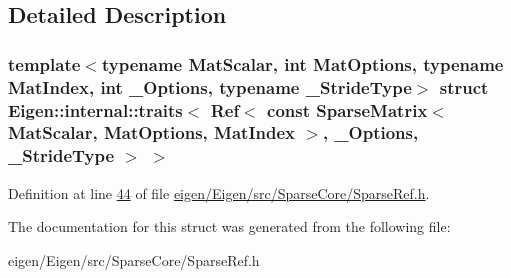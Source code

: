 \subsection{Detailed Description}
\subsubsection*{template$<$typename Mat\+Scalar, int Mat\+Options, typename Mat\+Index, int \+\_\+\+Options, typename \+\_\+\+Stride\+Type$>$\newline
struct Eigen\+::internal\+::traits$<$ Ref$<$ const Sparse\+Matrix$<$ Mat\+Scalar, Mat\+Options, Mat\+Index $>$, \+\_\+\+Options, \+\_\+\+Stride\+Type $>$ $>$}



Definition at line \hyperlink{eigen_2_eigen_2src_2_sparse_core_2_sparse_ref_8h_source_l00044}{44} of file \hyperlink{eigen_2_eigen_2src_2_sparse_core_2_sparse_ref_8h_source}{eigen/\+Eigen/src/\+Sparse\+Core/\+Sparse\+Ref.\+h}.



The documentation for this struct was generated from the following file\+:\begin{DoxyCompactItemize}
\item 
eigen/\+Eigen/src/\+Sparse\+Core/\+Sparse\+Ref.\+h\end{DoxyCompactItemize}
